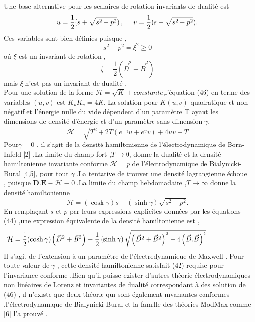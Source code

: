 \documentclass[12pt,a4paper, openany]{article}
\begin{document}
  Une base alternative pour les scalaires de rotation invariants de dualité est 
  \begin{equation}
  	u=\frac{1}{2}(s+\sqrt{s^2-p^2})\, ,\hspace{0.5cm} v=\frac{1}{2}(s-\sqrt{s^2-p^2}).
  \end{equation} 
  Ces variables sont bien définies puisque ,
  \begin{equation}
  	s^2-p^2=\xi^{2}\geq 0
  \end{equation}
  o\'{u} $\xi$ est un invariant de rotation ,
  \begin{equation}
  	\xi=\frac{1}{2}(\vec{D}^{2}-\vec{B}^{2})
  \end{equation}
  mais $\xi$ n'est pas un invariant de dualité .\\
  \hspace{0.5cm}Pour une solution de la forme $\mathcal{H}=\sqrt{K}+constante$,l'équation (46) en terme des variables $(u,v)$ est $K_uK_v=4K$. La solution pour $K(u,v)$ quadratique et non négatif et l'énergie nulle du vide dépendent d'un paramètre T ayant les dimensions de densité d'énergie et d'un paramètre sans dimension $\gamma$,
  \begin{equation}
  	\mathcal{H}=\sqrt{T^{2}+2T(e^{-\gamma}u+e^{\gamma}v)+4uv}-T
  \end{equation}
  Pour$\gamma =0$ , il s'agit de la densité hamiltonienne de l'électrodynamique de Born-Infeld [2] .La limite du champ fort ,$T\rightarrow{0}$, donne la dualité et la densité hamiltonienne invariante conforme $\mathcal{H} =p$ de l'électrodynamique de Bialynicki-Bural [4,5], pour tout $\gamma$ .La tentative de trouver une densité lagrangienne échoue , puisque $\textbf{D}.\textbf{E}-\mathcal{H}\equiv0$ .La limite du champ hebdomadaire ,$T\rightarrow{\infty}$ donne la densité hamiltonienne 
  \begin{equation}
  	\mathcal{H}=(\cosh{\gamma})s-(\sinh{\gamma})\sqrt{s^2-p^2} .
  \end{equation}
  En remplaçant $s$ et $p$ par leurs expressions explicites données par les équations (44) ,une expression équivalente de la densité hamiltonienne est ,
  \begin{equation}                                                          \hspace{-2cm}\mathcal{H}=\frac{1}{2}(\cosh{\gamma})\left(\vec{D}^{2}+\vec{B}^{2}\right)-\frac{1}{2}\left(\sinh{\gamma}\right)\sqrt{\left(\vec{D}^{2}+\vec{B}^{2}\right)^{2}-4\left(\vec{D}.\vec{B}\right)^{2}} .
\end{equation}
Il s'agit de l'extension à un paramètre de l'électrodynamique de Maxwell . Pour toute valeur de $\gamma$ , cette densité hamiltonienne satisfait (42) requise pour l'invariance conforme .Bien qu'il  puisse exister d'autres théorie électrodynamiques non linéaires de Lorenz et invariantes de dualité correspondant à des solution de (46) , il n'existe que deux théorie qui sont également invariantes conformes ,l'électrodynamique de Bialynicki-Bural et la famille des théories ModMax comme [6] l'a prouvé .
\end{document}
